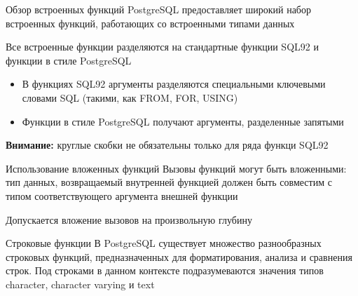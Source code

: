 \documentclass[12pt]{article}
\begin{document}
\begin{nota}{Обзор встроенных функций}
    PostgreSQL предоставляет широкий набор встроенных функций, работающих со встроенными типами данных

    Все встроенные функции разделяются на стандартные функции SQL92 и функции в стиле PostgreSQL

    \begin{itemize}
        \item В функциях SQL92 аргументы разделяются специальными ключевыми словами SQL (такими, как FROM, FOR, USING)
        \item Функции в стиле PostgreSQL получают аргументы, разделенные запятыми
    \end{itemize}

    \textbf{Внимание:} круглые скобки не обязательны только для ряда функци SQL92
\end{nota}

\begin{nota}{Использование вложенных функций}
    Вызовы функций могут быть вложенными: тип данных, возвращаемый внутренней функцией должен быть совместим с типом соответствующего аргумента внешней функции

    Допускается вложение вызовов на произвольную глубину
\end{nota}

\begin{defin}{Строковые функции}
    В PostgreSQL существует множество разнообразных строковых функций, предназначенных для форматирования, анализа и сравнения строк. Под строками в данном контексте подразумеваются значения типов character, character varying и text
\end{defin}
\end{document}
